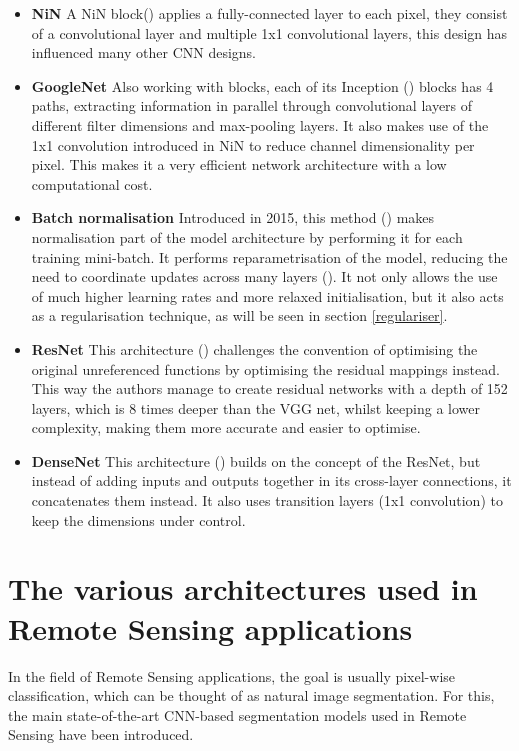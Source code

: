 \begin{itemize}

    \item \textbf{\gls{NiN}} A \gls{NiN} block(\cite{lin2014network}) applies a fully-connected layer to each pixel, they consist of a convolutional layer and multiple 1x1 convolutional layers, this design has influenced many other \gls{CNN} designs.
 
    \item \textbf{GoogleNet } Also working with blocks, each of its Inception (\cite{7298594}) blocks has 4 paths, extracting information in parallel through convolutional layers of different filter dimensions and max-pooling layers. It also makes use of the 1x1 convolution introduced in \gls{NiN} to reduce channel dimensionality per pixel. This makes it a very efficient network architecture with a low computational cost.
    
    \item \textbf{Batch normalisation} Introduced in 2015, this method (\cite{ioffe2015batch}) makes normalisation part of the model architecture by performing it for each training mini-batch. It performs reparametrisation of the model, reducing the need to coordinate updates across many layers (\cite{GoodBengCour16}). It not only allows the use of much higher learning rates and more relaxed initialisation, but it also acts as a regularisation technique, as will be seen in section \ref{regulariser}.
    
    \item \textbf{ResNet} This architecture (\cite{he2015deep}) challenges the convention of optimising the original unreferenced functions by optimising the residual mappings instead. This way the authors manage to create residual networks with a depth of 152 layers, which is $8$ times deeper than the VGG net, whilst keeping a lower complexity, making them more accurate and easier to optimise. 
    \item \textbf{DenseNet} This architecture (\cite{8099726}) builds on the concept of the ResNet, but instead of adding inputs and outputs together in its cross-layer connections, it concatenates them instead. It also uses transition layers (1x1 convolution) to keep the dimensions under control.

\end{itemize}

\section{The various architectures used in Remote Sensing applications} \label{seg_nets}
In the field of Remote Sensing applications, the goal is usually pixel-wise classification, which can be thought of as natural image segmentation. For this, the main state-of-the-art \gls{CNN}-based segmentation models used in Remote Sensing have been introduced.

